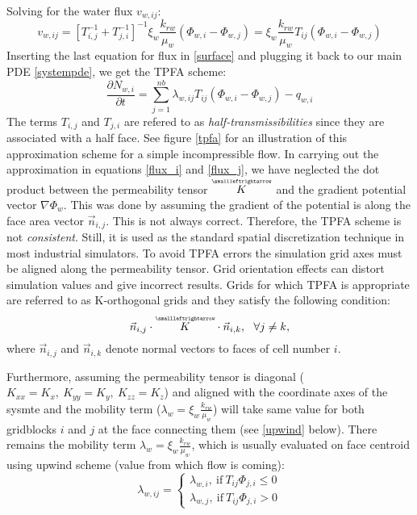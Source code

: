 Solving for the water flux $v_{w, ij}$:
\begin{equation}
v_{w, ij} = [T_{i,j}^{-1}+T_{j,i}^{-1}]^{-1}\xi_{w}\frac{k_{rw}}{\mu_{w}} (\Phi_{w,i}-\Phi_{w,j}) = \xi_{w}\frac{k_{rw}}{\mu_{w}}T_{ij}(\Phi_{w,i}-\Phi_{w,j})
\end{equation}
Inserting the last equation for flux in \ref{surface} and plugging it back to our main PDE \ref{systempde}, we get the TPFA scheme:
\begin{equation}
	\boxed{\frac{\partial N_{w,i}}{\partial t} = \sum_{j=1}^{nb}\lambda_{w,ij}T_{ij}(\Phi_{w,i}-\Phi_{w,j})- q_{w,i}}
\label{tpfa}
\end{equation}
The terms $T_{i,j}$ and $T_{j,i}$ are refered to as \textit{half-transmissibilities} since they are associated with a half face.
See figure \ref{tpfa} for an illustration of this approximation scheme for a simple incompressible flow.
In carrying out the approximation in equations \ref{flux_i} and \ref{flux_j}, we have neglected the dot product between the permeability tensor $\tensor{K}$ and
the gradient potential vector $\nabla\Phi_{w}$. This was done by assuming the gradient of the potential is along the face area vector $\vec{n}_{i,j}$. This is not always correct.
Therefore, the TPFA scheme is not \textit{consistent}. Still, it is used as the standard spatial discretization technique in most industrial simulators. To avoid TPFA errors the simulation
grid axes must be aligned along the permeability tensor. Grid orientation effects can distort simulation values and give incorrect results. Grids for which TPFA is appropriate are referred to as
K-orthogonal grids and they satisfy the following condition:
\begin{equation}
	\vec{n}_{i,j}\cdot\tensor{K}\cdot\vec{n}_{i,k}, \ \ \forall j\neq k,
	\label{korthogonal}
\end{equation}
where $\vec{n}_{i,j}$ and $\vec{n}_{i,k}$ denote normal vectors to faces of cell number $i$.

Furthermore, assuming the permeability tensor is diagonal ($K_{xx} = K_{x}, \ K_{yy} = K_{y},\ K_{zz} = K_{z}$) and aligned with the coordinate axes of the sysmte and 
the mobility term ($\lambda_{w} = \xi_{w}\frac{k_{rw}}{\mu_{w}}$) will take same value for both gridblocks $i$ and $j$ at the face connecting them (see \ref{upwind} below).
There remains the mobility term $\lambda_{w} = \xi_{w}\frac{k_{rw}}{\mu_{w}}$, which is usually evaluated on face centroid using upwind scheme (value from which flow is coming):
\begin{equation}
	\lambda_{w,ij} = 
	\begin{cases}
		\lambda_{w,i}, \ \text{if}\ T_{ij}\Phi_{j,i} \leq 0\\
		\lambda_{w,j}, \ \text{if}\ T_{ij}\Phi_{j,i} > 0
	\end{cases}
	\label{upwind}
\end{equation}

